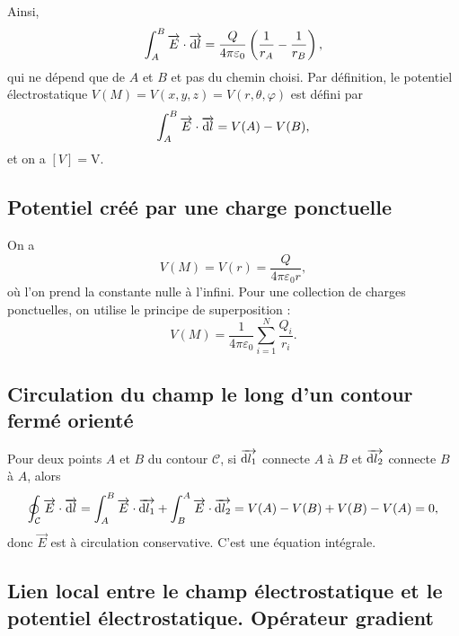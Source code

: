         Ainsi,
        \begin{equation*}
            \int_{A}^{B}\protect\overrightarrow{{E}}\cdot\protect\overrightarrow{{\mathrm{d} l}}=\frac{Q}{4\pi\varepsilon_{0}}\left(\frac{1}{r_{A}}-\frac{1}{r_{B}}\right),
        \end{equation*}
        qui ne dépend que de $A$ et $B$ et pas du chemin choisi. Par définition, le potentiel électrostatique $V(M)=V(x,y,z)=V(r,\theta,\varphi)$ est défini par 
        \begin{equation*}
            \int_{A}^{B}\protect\overrightarrow{{E}}\cdot\protect\overrightarrow{{\mathrm{d} l}}=V(A)-V(B),
        \end{equation*}
        et on a $[V]=\si{\volt}$.

    \subsection{Potentiel créé par une charge ponctuelle}

        On a 
        \begin{equation*}
            \boxed{
                V(M)=V(r)=\frac{Q}{4\pi\varepsilon_{0}r},
            }
        \end{equation*}
        où l'on prend la constante nulle à l'infini. Pour une collection de charges ponctuelles, on utilise le principe de superposition :
        \begin{equation*}
            \boxed{
                V(M)=\frac{1}{4\pi\varepsilon_{0}}\sum_{i=1}^{N}\frac{Q_i}{r_i}.
            }
        \end{equation*}

    \subsection{Circulation du champ le long d'un contour fermé orienté}

        Pour deux points $A$ et $B$ du contour $\mathcal{C}$, si $\protect\overrightarrow{{\mathrm{d} l_{1}}}$ connecte $A$ à $B$ et $\protect\overrightarrow{{\mathrm{d} l_{2}}}$ connecte $B$ à $A$, alors 
        \begin{equation*}
            \oint_{\mathcal{C}}\protect\overrightarrow{{E}}\cdot\protect\overrightarrow{{\mathrm{d} l}}=\int_{A}^{B}\protect\overrightarrow{{E}}\cdot\protect\overrightarrow{{\mathrm{d} l_{1}}}+\int_{B}^{A}\protect\overrightarrow{{E}}\cdot\protect\overrightarrow{{\mathrm{d} l_{2}}}=V(A)-V(B)+V(B)-V(A)=0,
        \end{equation*}
        donc $\vec{E}$ est à circulation conservative. C'est une équation intégrale.

    \subsection{Lien local entre le champ électrostatique et le potentiel électrostatique. Opérateur gradient}


